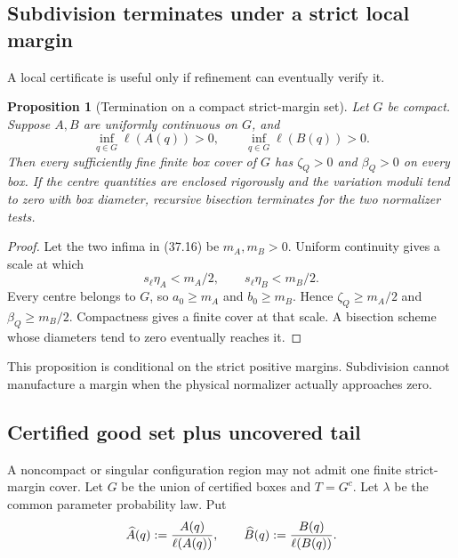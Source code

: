 \documentclass[11pt]{article}
\newtheorem{proposition}[theorem]{Proposition}
\theoremstyle{remark}
\begin{document}
\subsection{Subdivision terminates under a strict local margin}

A local certificate is useful only if refinement can eventually
verify it.

\begin{proposition}[Termination on a compact strict-margin set]
\label{prop:v12v37-termination}
Let \(G\) be compact.  Suppose \(A,B\) are uniformly continuous on
\(G\), and
\begin{equation}
 \inf_{q\in G}\ell(A(q))>0,\qquad
 \inf_{q\in G}\ell(B(q))>0.                       \tag{37.16}
\end{equation}
Then every sufficiently fine finite box cover of \(G\) has
\(\zeta_Q>0\) and \(\beta_Q>0\) on every box.  If the centre
quantities are enclosed rigorously and the variation moduli tend to
zero with box diameter, recursive bisection terminates for the two
normalizer tests.
\end{proposition}

\begin{proof}
Let the two infima in (37.16) be \(m_A,m_B>0\).
Uniform continuity gives a scale at which
\[
 s_\ell\eta_A<m_A/2,\qquad s_\ell\eta_B<m_B/2.
\]
Every centre belongs to \(G\), so \(a_0\geq m_A\) and
\(b_0\geq m_B\).  Hence
\(\zeta_Q\geq m_A/2\) and \(\beta_Q\geq m_B/2\).
Compactness gives a finite cover at that scale.  A bisection scheme
whose diameters tend to zero eventually reaches it.
\end{proof}

This proposition is conditional on the strict positive margins.
Subdivision cannot manufacture a margin when the physical
normalizer actually approaches zero.

\subsection{Certified good set plus uncovered tail}

A noncompact or singular configuration region may not admit one
finite strict-margin cover.  Let \(G\) be the union of certified
boxes and \(T=G^c\).  Let \(\lambda\) be the common parameter
probability law.  Put
\[
 \widehat A(q):={A(q)\over\ell(A(q))},
 \qquad
 \widehat B(q):={B(q)\over\ell(B(q))}.
\]
\end{document}
